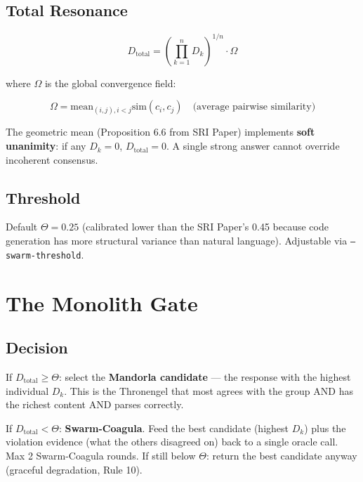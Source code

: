 \documentclass[11pt,a4paper]{article}
\begin{document}
\subsection{Total Resonance}

\begin{equation}
D_\text{total} = \left(\prod_{k=1}^{n} D_k\right)^{1/n} \cdot \Omega
\label{eq:dtotal}
\end{equation}

where $\Omega$ is the global convergence field:

\begin{equation}
\Omega = \text{mean}_{(i,j), i < j} \text{sim}(c_i, c_j) \quad\text{(average pairwise similarity)}
\end{equation}

The geometric mean (Proposition 6.6 from SRI Paper) implements 
\textbf{soft unanimity}: if any $D_k = 0$, $D_\text{total} = 0$. 
A single strong answer cannot override incoherent consensus.

\subsection{Threshold}

Default $\Theta = 0.25$ (calibrated lower than the SRI Paper's 0.45 
because code generation has more structural variance than natural 
language). Adjustable via \texttt{--swarm-threshold}.


\section{The Monolith Gate}
\label{sec:monolith}

\subsection{Decision}

If $D_\text{total} \geq \Theta$: select the \textbf{Mandorla 
candidate} --- the response with the highest individual $D_k$. 
This is the Thronengel that most agrees with the group AND has 
the richest content AND parses correctly.

If $D_\text{total} < \Theta$: \textbf{Swarm-Coagula}. Feed the 
best candidate (highest $D_k$) plus the violation evidence 
(what the others disagreed on) back to a single oracle call. 
Max 2 Swarm-Coagula rounds. If still below $\Theta$: return the 
best candidate anyway (graceful degradation, Rule 10).
\end{document}
